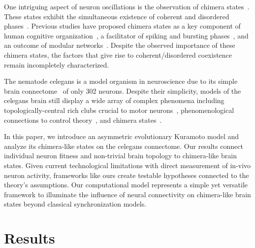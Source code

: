 \documentclass[pdflatex,twocolumn,sn-nature,super]{sn-jnl}
\begin{document}
One intriguing aspect of neuron oscillations
is the observation of chimera states~\citep{majhi2019chimera}.
These states exhibit the simultaneous existence
of coherent and disordered phases~\citep{abrams2004chimera}.
Previous studies have proposed
chimera states as
a key component of human cognitive organization~\citep{bansal2019cognitive},
a facilitator of spiking and bursting phases~\citep{santos2017chimera},
and an outcome of modular networks~\citep{hizanidis2016chimera}.
Despite the observed importance of these chimera states,
the factors that give rise to coherent/disordered coexistence
remain incompletely characterized.

The nematode \gls{celegans}
is a model organism in neuroscience due to
its simple brain connectome~\citep{cook2019whole}
of only \num{302} neurons.
Despite their simplicity, models of the \gls{celegans} brain
still display a wide array of complex phenomena including
topologically-central rich clubs
crucial to motor neurons~\citep{towlson2013rich},
phenomenological connections to control theory~\citep{yan2017network},
and chimera states~\citep{hizanidis2016chimera}.

In this paper,
we introduce an asymmetric evolutionary Kuramoto model
and analyze its chimera-like states on the
\gls{celegans} connectome.
Our results connect individual neuron fitness and non-trivial brain topology
to chimera-like brain states.
Given current technological limitations with direct measurement of in-vivo neuron activity,
frameworks like ours create testable hypotheses connected to the theory's assumptions.
Our computational model represents a simple yet versatile framework
to illuminate the influence of neural connectivity on chimera-like brain states
beyond classical synchronization models.

\section{Results}\label{sec:results}
\end{document}
